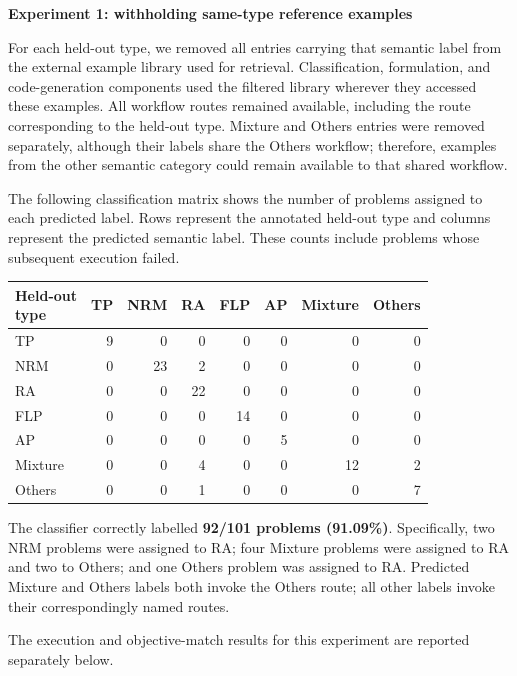 \documentclass[11pt]{article}
\begin{document}
\begin{enumerate}[label=(R1.Major.\arabic*),leftmargin=*]
\medskip
\noindent\textbf{Experiment 1: withholding same-type reference examples}

For each held-out type, we removed all entries carrying that semantic label from the external example library used for retrieval. Classification, formulation, and code-generation components used the filtered library wherever they accessed these examples. All workflow routes remained available, including the route corresponding to the held-out type. Mixture and Others entries were removed separately, although their labels share the Others workflow; therefore, examples from the other semantic category could remain available to that shared workflow.

The following classification matrix shows the number of problems assigned to each predicted label. Rows represent the annotated held-out type and columns represent the predicted semantic label. These counts include problems whose subsequent execution failed.

\begin{center}
\small
\setlength{\tabcolsep}{5pt}
\renewcommand{\arraystretch}{1.12}
\begin{tabular}{lrrrrrrr}
\hline
\shortstack[l]{Held-out\\type}
& TP & NRM & RA & FLP & AP & Mixture & Others \\
\hline
TP      & 9 & 0  & 0  & 0  & 0 & 0  & 0 \\
NRM     & 0 & 23 & 2  & 0  & 0 & 0  & 0 \\
RA      & 0 & 0  & 22 & 0  & 0 & 0  & 0 \\
FLP     & 0 & 0  & 0  & 14 & 0 & 0  & 0 \\
AP      & 0 & 0  & 0  & 0  & 5 & 0  & 0 \\
Mixture & 0 & 0  & 4  & 0  & 0 & 12 & 2 \\
Others  & 0 & 0  & 1  & 0  & 0 & 0  & 7 \\
\hline
\end{tabular}
\end{center}

The classifier correctly labelled \textbf{92/101 problems (91.09\%)}. Specifically, two NRM problems were assigned to RA; four Mixture problems were assigned to RA and two to Others; and one Others problem was assigned to RA. Predicted Mixture and Others labels both invoke the Others route; all other labels invoke their correspondingly named routes.

The execution and objective-match results for this experiment are reported separately below.


\end{enumerate}
\end{document}
